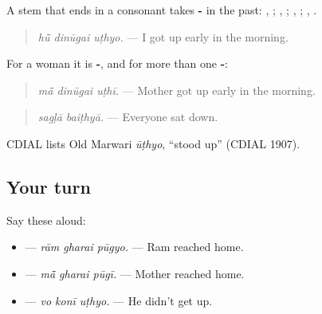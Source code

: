 \begin{grammarlens}[title={Grammar Lens: -\mw{यो} on a consonant stem}]
A stem that ends in a consonant takes \textbf{-} in the past: \textbf{}, \textbf{}; \textbf{}, \textbf{}; \textbf{}, \textbf{}; \textbf{}, \textbf{}.

\begin{quote}
\textbf{  }
\end{quote}

\begin{quote}
\emph{hū̃ dinūgai uṭhyo.} — I got up early in the morning.
\end{quote}

For a woman it is \textbf{-}, and for more than one \textbf{-}:

\begin{quote}
\textbf{  }
\end{quote}

\begin{quote}
\emph{mā̃ dinūgai uṭhī.} — Mother got up early in the morning.
\end{quote}

\begin{quote}
\textbf{ }
\end{quote}

\begin{quote}
\emph{sagḷā baiṭhyā.} — Everyone sat down.
\end{quote}

CDIAL lists Old Marwari \emph{ūṭhyo}, \textquotedblleft{}stood up\textquotedblright{} (CDIAL 1907).
\end{grammarlens}

\subsection*{Your turn}
Say these aloud:

\begin{itemize}
\raggedright
  \item \textbf{  } — \emph{rām gharai pūgyo.} — Ram reached home.
  \item \textbf{  } — \emph{mā̃ gharai pūgī.} — Mother reached home.
  \item \textbf{  } — \emph{vo konī uṭhyo.} — He didn't get up.
\end{itemize}


